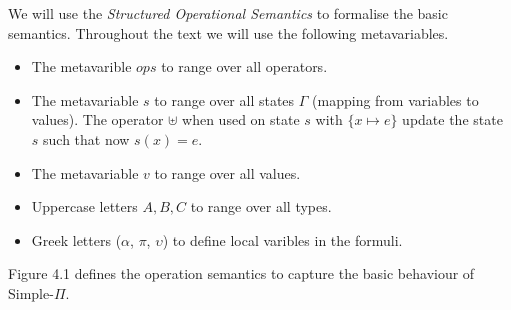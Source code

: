 \documentclass[a4paper,12pt]{report}
\begin{document}
\par
We will use the \textit{Structured Operational Semantics} \cite{plotkinSOS} to 
formalise the basic semantics. Throughout the text we will use the following 
metavariables. 
\begin{itemize}
  \item The metavarible $ops$ to range over all operators.
  \item The metavariable $s$ to range over all states $\Gamma$ 
  (mapping from variables to values). The operator $\uplus$ when used on 
state $s$ with $\{x \mapsto e\}$ update the state $s$ such that now $s(x) = 
e$.
  \item The metavariable $v$ to range over all values.
  \item Uppercase letters $A,B,C$ to range over all types.
  \item Greek letters ($\alpha$, $\pi$, $\upsilon$) to define local varibles in 
  the formuli. 
\end{itemize}
Figure 4.1 defines the operation semantics to capture the basic behaviour of 
Simple-$\Pi$.
\end{document}
